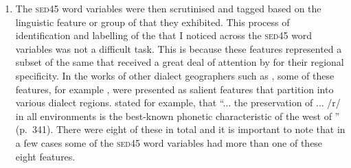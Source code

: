 \begin{enumerate}
\item{The \textsc{sed45} word variables were then scrutinised and tagged based on the linguistic feature or group of  that they exhibited. This process of identification and labelling of the  that I noticed across the \textsc{sed45} word variables was not a difficult task. This is because these features represented a subset of the same  that received a great deal of attention by \citet{Orton6271} for their regional specificity. In the works of other dialect geographers such as \citet{Wells82}, some of these features, for example , were presented as salient features that partition  into various dialect regions. \citet{Wells82} stated for example, that ``... the preservation of ... /r/ in all environments is the best-known phonetic characteristic of the west of '' (p.~341). There were eight of these  in total and it is important to note that in a few cases some of the \textsc{sed45} word variables had more than one of these eight features.}

\end{enumerate}


